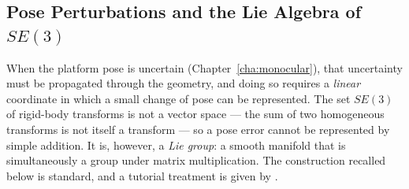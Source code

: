 \subsection{Pose Perturbations and the Lie Algebra of $SE(3)$}
\label{sec:pose_perturbations}

When the platform pose is uncertain (Chapter~\ref{cha:monocular}), that
uncertainty must be propagated through the geometry, and doing so requires a
\emph{linear} coordinate in which a small change of pose can be represented. The
set $SE(3)$ of rigid-body transforms is not a vector space --- the sum of two
homogeneous transforms is not itself a transform --- so a pose error cannot be
represented by simple addition. It is, however, a \emph{Lie group}: a smooth
manifold that is simultaneously a group under matrix multiplication. The
construction recalled below is standard, and a tutorial treatment is given by
.

